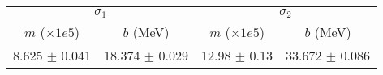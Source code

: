 \begin{tabular}{cc|cc}
\multicolumn{2}{c|}{$\sigma_1$} & \multicolumn{2}{|c}{$\sigma_2$} \\
$m$ ($\times1e5$) & $b$ (MeV) & $m$ ($\times1e5$) & $b$ (MeV) \\
\hline
8.625 $\pm$ 0.041 & 18.374 $\pm$ 0.029 & 12.98 $\pm$ 0.13 & 33.672 $\pm$ 0.086\\
\end{tabular}
